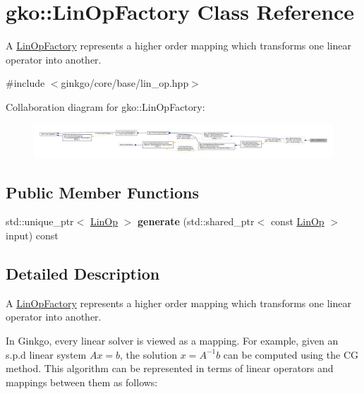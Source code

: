 \hypertarget{classgko_1_1LinOpFactory}{}\section{gko\+:\+:Lin\+Op\+Factory Class Reference}
\label{classgko_1_1LinOpFactory}


A \hyperlink{classgko_1_1LinOpFactory}{Lin\+Op\+Factory} represents a higher order mapping which transforms one linear operator into another.  




{\ttfamily \#include $<$ginkgo/core/base/lin\+\_\+op.\+hpp$>$}



Collaboration diagram for gko\+:\+:Lin\+Op\+Factory\+:
\nopagebreak
\begin{figure}[H]
\begin{center}
\leavevmode
\includegraphics[width=350pt]{classgko_1_1LinOpFactory__coll__graph}
\end{center}
\end{figure}
\subsection*{Public Member Functions}
\begin{DoxyCompactItemize}
\item 
\mbox{\label{classgko_1_1LinOpFactory_aa0487967d33e22a38d8dd2c8a5188c48}} 
std\+::unique\+\_\+ptr$<$ \hyperlink{classgko_1_1LinOp}{Lin\+Op} $>$ {\bfseries generate} (std\+::shared\+\_\+ptr$<$ const \hyperlink{classgko_1_1LinOp}{Lin\+Op} $>$ input) const
\end{DoxyCompactItemize}


\subsection{Detailed Description}
A \hyperlink{classgko_1_1LinOpFactory}{Lin\+Op\+Factory} represents a higher order mapping which transforms one linear operator into another. 

In Ginkgo, every linear solver is viewed as a mapping. For example, given an s.\+p.\+d linear system $Ax = b$, the solution $x = A^{-1}b$ can be computed using the CG method. This algorithm can be represented in terms of linear operators and mappings between them as follows\+:


